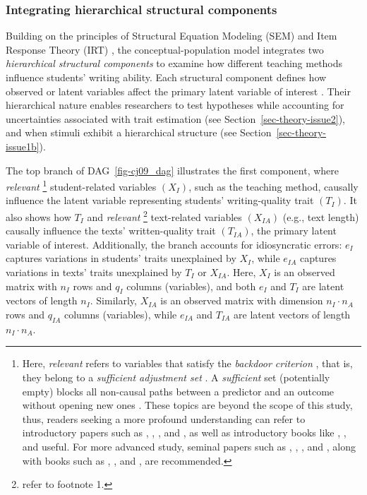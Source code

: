 \documentclass[
  authoryear,
  review,
  1p]{elsarticle}
\begin{document}
\subsubsection{Integrating hierarchical structural
components}\label{sec-theory-theoretical_P3}

Building on the principles of Structural Equation Modeling (SEM)
\citep[pp.~138]{Hoyle_et_al_2023} and Item Response Theory (IRT)
\citetext{\citealp[chap.~6]{Fox_2010}; \citealp[chap.~24]{vanderLinden_et_al_2017_I}},
the conceptual-population model integrates two \emph{hierarchical
structural components} to examine how different teaching methods
influence students' writing ability. Each structural component defines
how observed or latent variables affect the primary latent variable of
interest \citep{Everitt_et_al_2010}. Their hierarchical nature enables
researchers to test hypotheses while accounting for uncertainties
associated with trait estimation (see Section~\ref{sec-theory-issue2}),
and when stimuli exhibit a hierarchical structure (see
Section~\ref{sec-theory-issue1b}).

The top branch of DAG~\ref{fig-cj09_dag} illustrates the first
component, where \emph{relevant} \footnote{Here, \emph{relevant} refers
  to variables that satisfy the \emph{backdoor criterion} \citep[pp
  37]{Neal_2020}, that is, they belong to a \emph{sufficient adjustment
  set} \citep{Pearl_2009, Pearl_et_al_2016, Morgan_et_al_2014}. A
  \emph{sufficient} set (potentially empty) blocks all non-causal paths
  between a predictor and an outcome without opening new ones
  \citep{Pearl_2009}. These topics are beyond the scope of this study,
  thus, readers seeking a more profound understanding can refer to
  introductory papers such as \citet{Pearl_2010}, \citet{Rohrer_2018},
  \citet{Pearl_2019}, and \citet{Cinelli_et_al_2020}, as well as
  introductory books like \citet{Pearl_et_al_2018}, \citet{Neal_2020},
  and \citet{McElreath_2020} useful. For more advanced study, seminal
  papers such as \citet{Neyman_et_al_1923}, \citet{Rubin_1974},
  \citet{Spirtes_et_al_1991}, and \citet{Sekhon_2009}, along with books
  such as \citet{Pearl_2009}, \citet{Morgan_et_al_2014}, and
  \citet{Hernan_et_al_2020}, are recommended.} student-related variables
\((X_{I})\), such as the teaching method, causally influence the latent
variable representing students' writing-quality trait \((T_{I})\). It
also shows how \(T_{I}\) and \emph{relevant} \footnote{refer to footnote
  1.} text-related variables \((X_{IA})\) (e.g., text length) causally
influence the texts' written-quality trait \((T_{IA})\), the primary
latent variable of interest. Additionally, the branch accounts for
idiosyncratic errors: \(e_{I}\) captures variations in students' traits
unexplained by \(X_{I}\), while \(e_{IA}\) captures variations in texts'
traits unexplained by \(T_{I}\) or \(X_{IA}\). Here, \(X_{I}\) is an
observed matrix with \(n_{I}\) rows and \(q_{I}\) columns (variables),
and both \(e_{I}\) and \(T_{I}\) are latent vectors of length \(n_{I}\).
Similarly, \(X_{IA}\) is an observed matrix with dimension
\(n_{I} \cdot n_{A}\) rows and \(q_{IA}\) columns (variables), while
\(e_{IA}\) and \(T_{IA}\) are latent vectors of length
\(n_{I} \cdot n_{A}\).
\end{document}
